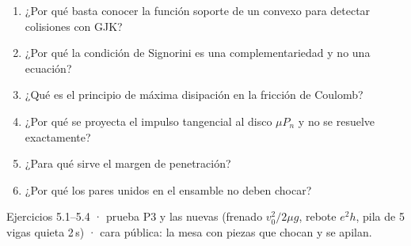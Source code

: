 \documentclass[11pt,a4paper]{article}
\begin{document}
\begin{control}
\begin{enumerate}[leftmargin=*]
  \item ¿Por qué basta conocer la función soporte de un convexo para detectar colisiones con GJK?
  \item ¿Por qué la condición de Signorini es una complementariedad y no una ecuación?
  \item ¿Qué es el principio de máxima disipación en la fricción de Coulomb?
  \item ¿Por qué se proyecta el impulso tangencial al disco $\mu P_n$ y no se resuelve exactamente?
  \item ¿Para qué sirve el margen de penetración?
  \item ¿Por qué los pares unidos en el ensamble no deben chocar?
\end{enumerate}
\end{control}

\begin{cierre}
Ejercicios 5.1--5.4 · prueba P3 y las nuevas (frenado $v_0^2/2\mu g$, rebote $e^2h$, pila de 5 vigas quieta 2\,s) ·
cara pública: la mesa con piezas que chocan y se apilan.
\end{cierre}
\end{document}
